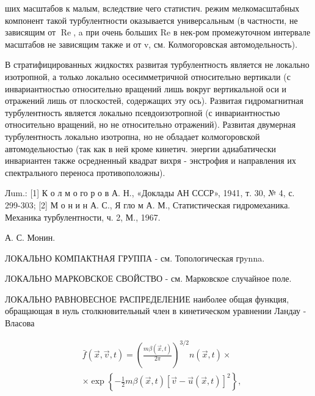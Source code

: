 \documentclass[10pt]{article}
\begin{document}
ших масштабов к малым, вследствие чего статистич. режим мелкомасштабных компонент такой турбулентности оказывается универсальным (в частности, не зависящим от $\operatorname{Re}$, a при очень больших Re в нек-ром промежуточном интервале масштабов не зависящим также и от v, см. Колмогоровская автомодельность).



В стратифицированных жидкостях развитая турбулентность является не локально изотропной, а только локально осесимметричной относительно вертикали (с инвариантностью относительно вращений лишь вокруг вертикальной оси и отражений лишь от плоскостей, содержащих эту ось). Развитая гидромагнитная турбулентность является локально псевдоизотропной (с инвариантностью относительно вращений, но не относительно отражений). Развитая двумерная турбулентность локально изотропна, но не обладает колмогоровской автомодельностью (так как в ней кроме кинетич. энергии адиабатически инвариантен также осредненный квадрат вихря - энстрофия и направления их спектрального переноса противоположны).



Лum.: [1] К о л м о го р о в А. Н., «Доклады АН СССР», 1941, т. 30, № 4, с. 299-303; [2] М о н и н А. С., Я гло м А. М., Статистическая гидромеханика. Механика турбулентности, ч. 2, М., 1967.



А. С. Монин.



ЛОКАЛЬНО КОМПАКТНАЯ ГРУППА - см. Топологическая грynna.



ЛОКАЛЬНО МАРКОВСКОЕ СВОЙСТВО - см. Марковское случайное поле.



ЛОКАЛЬНО РАВНОВЕСНОЕ РАСПРЕДЕЛЕНИЕ наиболее общая функция, обращающая в нуль столкновительный член в кинетическом уравнении Ландау - Власова



\[

\begin{aligned}

& \bar{f}(\vec{x}, \vec{v}, t)=\left(\frac{m \beta(\vec{x}, t)}{2 \pi}\right)^{3 / 2} n(\vec{x}, t) \times \\

& \times \exp \left\{-\frac{1}{2} m \beta(\vec{x}, t)[\vec{v}-\vec{u}(\vec{x}, t)]^{2}\right\},

\end{aligned}

\]
\end{document}

